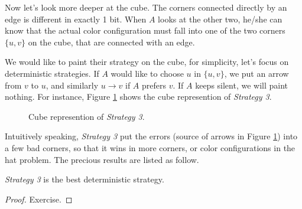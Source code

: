 \documentclass{scribe}
\begin{document}
Now let's look more deeper at the cube. The corners connected directly by an edge is different in exactly 1 bit. When $A$ looks at the other two, he/she can know that the actual color configuration must fall into one of the two corners $\{u, v\}$ on the cube, that are connected with an edge.
 
We would like to paint their strategy on the cube, for simplicity, let's focus on deterministic strategies. If $A$ would like to choose $u$ in $\{u, v\}$, we put an arrow from $v$ to $u$, and similarly $u\to v$ if $A$ prefers $v$. If $A$ keeps silent, we will paint nothing. For instance, Figure \ref{strategy-3} shows the cube represention of \textit{Strategy 3}.

\begin{figure}[htb]
  \centering
  \caption{Cube represention of \textit{Strategy 3}.}\label{strategy-3}
\end{figure}

Intuitively speaking, \textit{Strategy 3} put the errors (source of arrows in Figure \ref{strategy-3}) into a few bad corners, so that it wins in more corners, or color configurations in the hat problem. The precious results are listed as follow.

\begin{lemma}
  \label{lemma:optimal}
  \textit{Strategy 3} is the best deterministic strategy. 
\end{lemma}
\begin{proof}
  Exercise.
\end{proof}
\end{document}
